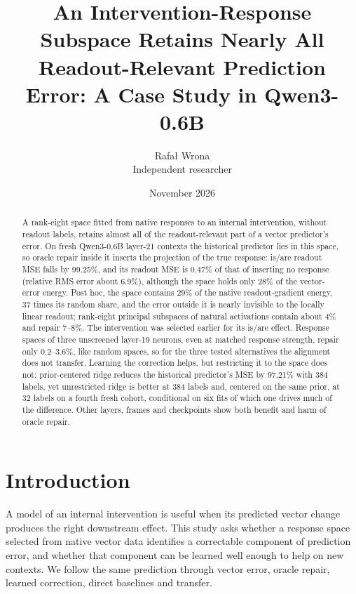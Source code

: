 \documentclass[11pt]{article}
\title{An Intervention-Response Subspace Retains Nearly All\\Readout-Relevant Prediction Error: A Case Study in Qwen3-0.6B}
\author{Rafa\l{} Wrona\\ \small Independent researcher}
\date{November 2026}
\begin{document}
\maketitle
\begin{abstract}
A rank-eight space fitted from native responses to an internal intervention, without readout labels, retains almost all of the readout-relevant part of a vector predictor's error. On fresh Qwen3-0.6B layer-21 contexts the historical predictor lies in this space, so oracle repair inside it inserts the projection of the true response: is/are readout MSE falls by 99.25\%, and its readout MSE is 0.47\% of that of inserting no response (relative RMS error about 6.9\%), although the space holds only 28\% of the vector-error energy. Post hoc, the space contains 29\% of the native readout-gradient energy, 37 times its random share, and the error outside it is nearly invisible to the locally linear readout; rank-eight principal subspaces of natural activations contain about 4\% and repair 7--8\%. The intervention was selected earlier for its is/are effect. Response spaces of three unscreened layer-19 neurons, even at matched response strength, repair only 0.2--3.6\%, like random spaces, so for the three tested alternatives the alignment does not transfer. Learning the correction helps, but restricting it to the space does not: prior-centered ridge reduces the historical predictor's MSE by 97.21\% with 384 labels, yet unrestricted ridge is better at 384 labels and, centered on the same prior, at 32 labels on a fourth fresh cohort, conditional on six fits of which one drives much of the difference. Other layers, frames and checkpoints show both benefit and harm of oracle repair.
\end{abstract}

\section{Introduction}
A model of an internal intervention is useful when its predicted vector change produces the right downstream effect. This study asks whether a response space selected from native vector data identifies a correctable component of prediction error, and whether that component can be learned well enough to help on new contexts. We follow the same prediction through vector error, oracle repair, learned correction, direct baselines and transfer.
\end{document}
